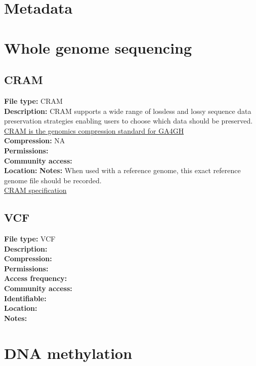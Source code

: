 \documentclass[
]{book}
\begin{document}
\hypertarget{metadata}{%
\chapter{Metadata}\label{metadata}}

\hypertarget{whole-genome-sequencing}{%
\chapter{Whole genome sequencing}\label{whole-genome-sequencing}}

\hypertarget{cram}{%
\section{CRAM}\label{cram}}

\textbf{File type:} CRAM\\
\textbf{Description:} CRAM supports a wide
range of lossless and lossy sequence data preservation strategies enabling users to choose which data should be preserved. \href{https://www.ga4gh.org/cram/}{CRAM is the genomics compression standard for GA4GH}\\
\textbf{Compression:} NA\\
\textbf{Permissions:}\\
\textbf{Community access:}\\
\textbf{Location:}
\textbf{Notes:} When used with a reference genome, this exact reference genome file should be recorded.\\
\href{https://samtools.github.io/hts-specs/CRAMv3.pdf}{CRAM specification}

\hypertarget{vcf}{%
\section{VCF}\label{vcf}}

\textbf{File type:} VCF\\
\textbf{Description:}\\
\textbf{Compression:}\\
\textbf{Permissions:}\\
\textbf{Access frequency:}\\
\textbf{Community access:}\\
\textbf{Identifiable:}\\
\textbf{Location:}\\
\textbf{Notes:}

\hypertarget{dna-methylation}{%
\chapter{DNA methylation}\label{dna-methylation}}
\end{document}
